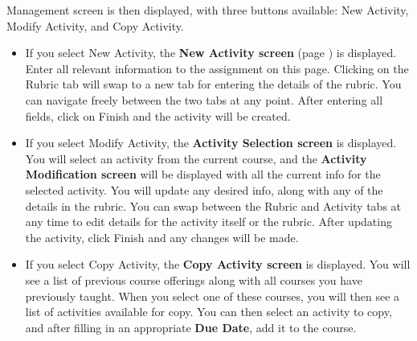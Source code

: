 \documentclass{article}
\begin{document}
\begin{itemize}
\begin{itemize}
{	  Management screen} is then displayed, with three buttons available: New 
	Activity, Modify Activity, and Copy Activity.
	\begin{itemize}
	\item If you select New Activity, the \textbf{New Activity screen} 
	  (page \pageref{newActivity}) is displayed.
	  Enter all relevant information to the assignment on this page. Clicking on
	  the Rubric tab will swap to a new tab for entering the details of the rubric.
	  You can navigate freely between the two tabs at any point. After entering
	  all fields, click on Finish and the activity will be created.
	\item If you select Modify Activity, the \textbf{Activity Selection screen} is
	  displayed. You will select an activity from the current course, and the
	  \textbf{Activity Modification screen} will be displayed with all the current
	  info for the selected activity. You will update any desired info, along with
	  any of the details in the rubric. You can swap between the Rubric and 
	  Activity tabs at any time to edit details for the activity itself or
          the rubric.
	  After updating the activity, click Finish and any changes will be made.
	\item If you select Copy Activity, the \textbf{Copy Activity screen}
          is displayed.
	  You will see a list of previous course offerings along with all courses you
	  have previously taught. When you select one of these courses, you will
	  then see a list of activities available for copy. You can then select an
	  activity to copy, and after filling in an appropriate \textbf{Due Date}, add 
	  it to the course.
	\end{itemize}
    \end{itemize}
\end{itemize}
\end{document}
